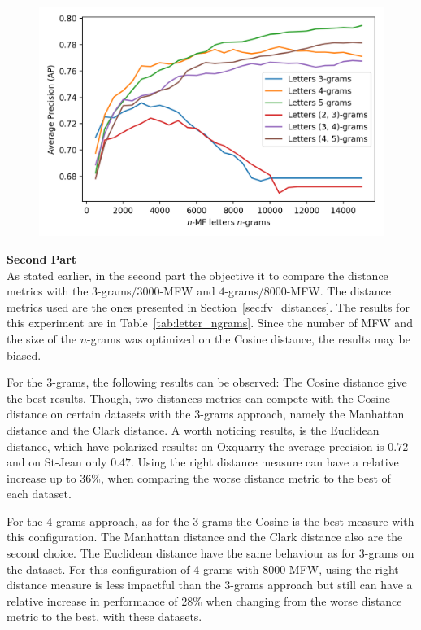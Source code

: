 \begin{figure}
  \label{fig:letter_ngrams_st_jean}
  \includegraphics[width=\linewidth]{img/letter_ngrams_st_jean.png}
\end{figure}

\textbf{Second Part}\\
As stated earlier, in the second part the objective it to compare the distance metrics with the $3$-grams/$3000$-MFW and $4$-grams/$8000$-MFW.
The distance metrics used are the ones presented in Section~\ref{sec:fv_distances}.
The results for this experiment are in Table~\ref{tab:letter_ngrams}.
Since the number of MFW and the size of the $n$-grams was optimized on the Cosine distance, the results may be biased.

For the $3$-grams, the following results can be observed:
The Cosine distance give the best results.
Though, two distances metrics can compete with the Cosine distance on certain datasets with the $3$-grams approach, namely the Manhattan distance and the Clark distance.
A worth noticing results, is the Euclidean distance, which have polarized results: on Oxquarry the average precision is $0.72$ and on St-Jean only $0.47$.
Using the right distance measure can have a relative increase up to $36$\%, when comparing the worse distance metric to the best of each dataset.

For the $4$-grams approach, as for the $3$-grams the Cosine is the best measure with this configuration.
The Manhattan distance and the Clark distance also are the second choice.
The Euclidean distance have the same behaviour as for $3$-grams on the dataset.
For this configuration of $4$-grams with $8000$-MFW, using the right distance measure is less impactful than the $3$-grams approach but still can have a relative increase in performance of $28$\% when changing from the worse distance metric to the best, with these datasets.


